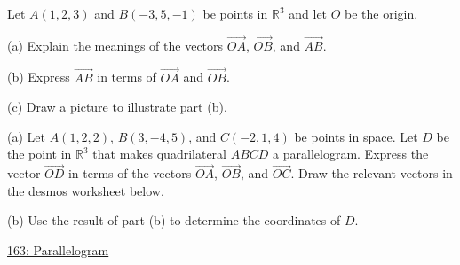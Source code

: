 \documentclass{ximera}
\begin{document}
\begin{question}  \label{Q:dsfr4rtgt4r}
Let $A(1,2,3)$ and $B(-3,5,-1)$ be points in $\mathbb{R}^3$ and let $O$ be the origin.

(a) Explain the meanings of the vectors $\overrightarrow{OA}$, $\overrightarrow{OB}$, and $\overrightarrow{AB}$.

(b) Express $\overrightarrow{AB}$ in terms of $\overrightarrow{OA}$ and $\overrightarrow{OB}$.

(c) Draw a picture to illustrate part (b).
\end{question}


\begin{question}  \label{Q:df945r435r34}
(a) Let $A(1,2,2)$, $B(3,-4,5)$, and $C(-2,1,4)$ be points in space. Let $D$ be the point in $\mathbb{R}^3$ that makes quadrilateral $ABCD$ a parallelogram. Express the vector $\overrightarrow{OD}$ in terms of the vectors $\overrightarrow{OA}$, $\overrightarrow{OB}$, and $\overrightarrow{OC}$. Draw the relevant vectors in the desmos worksheet below.

(b) Use the result of part (b) to determine the coordinates of $D$.

\begin{onlineOnly}
    \begin{center}
\end{center}
\end{onlineOnly}

\href{https://www.desmos.com/3d/hxegp3eszd}{163: Parallelogram}
\end{question}
\end{document}
